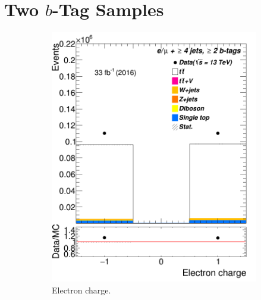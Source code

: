 
\section{Two $b$-Tag Samples}

	



\begin{figure} %
	\centering	
	\begin{subfigure}{0.25\textwidth}
		\includegraphics[width=\linewidth]{ControlPlots_emujets_2016_4incl_2incl/el_charge_emujets_2016.png}
		\caption{Electron charge.} \label{fig:a1}
	\end{subfigure}\hspace*{1.0cm}
	\begin{subfigure}{0.25\textwidth}

\end{subfigure}
\end{figure}
